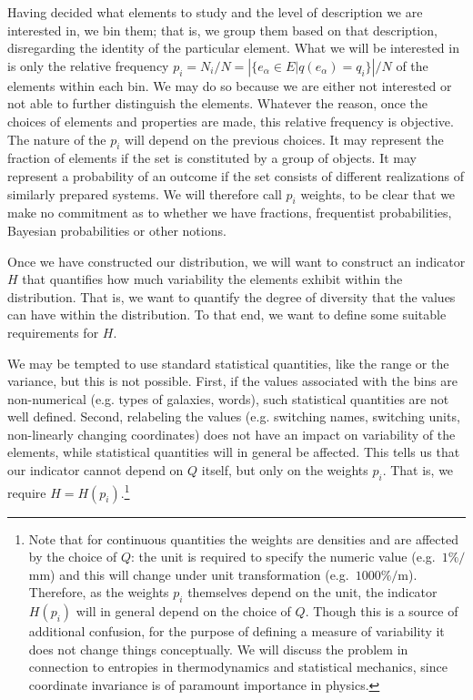 \documentclass{article}
\begin{document}
Having decided what elements to study and the level of description we are interested in, we bin them; that is, we group them based on that description, disregarding the identity of the particular element. What we will be interested in is only the relative frequency $p_i = N_i / N = \left| \{e_\alpha \in E | q(e_\alpha) = q_i \} \right| / N$ of the elements within each bin. We may do so because we are either not interested or not able to further distinguish the elements. Whatever the reason, once the choices of elements and properties are made, this relative frequency is objective. The nature of the $p_i$ will depend on the previous choices. It may represent the fraction of elements if the set is constituted by a group of objects. It may represent a probability of an outcome if the set consists of different realizations of similarly prepared systems. We will therefore call $p_i$ weights, to be clear that we make no commitment as to whether we have fractions, frequentist probabilities, Bayesian probabilities or other notions.

Once we have constructed our distribution, we will want to construct an indicator $H$ that quantifies how much variability the elements exhibit within the distribution. That is, we want to quantify the degree of diversity that the values can have within the distribution. To that end, we want to define some suitable requirements for $H$.

We may be tempted to use standard statistical quantities, like the range or the variance, but this is not possible. First, if the values associated with the bins are non-numerical (e.g. types of galaxies, words), such statistical quantities are not well defined. Second, relabeling the values (e.g. switching names, switching units, non-linearly changing coordinates) does not have an impact on variability of the elements, while statistical quantities will in general be affected. This tells us that our indicator cannot depend on $Q$ itself, but only on the weights $p_i$. That is, we require $H=H(p_i)$.\footnote{Note that for continuous quantities the weights are densities and are affected by the choice of $Q$: the unit is required to specify the numeric value (e.g.~$1 \% / $mm) and this will change under unit transformation (e.g.~$1000 \% /$m). Therefore, as the weights $p_i$ themselves depend on the unit, the indicator $H(p_i)$ will in general depend on the choice of $Q$. Though this is a source of additional confusion, for the purpose of defining a measure of variability it does not change things conceptually. We will discuss the problem in connection to entropies in thermodynamics and statistical mechanics, since coordinate invariance is of paramount importance in physics.}
\end{document}
